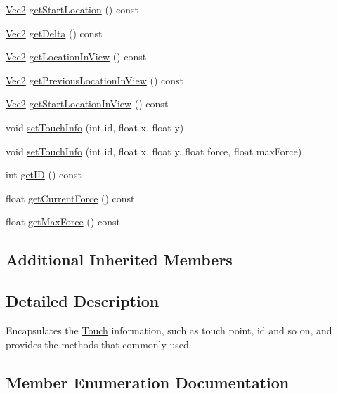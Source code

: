 \begin{DoxyCompactItemize}
\item 
\hyperlink{classVec2}{Vec2} \hyperlink{classTouch_a41f954b7af4bd5ae3af1f78ace3bc4e2}{get\+Start\+Location} () const
\item 
\hyperlink{classVec2}{Vec2} \hyperlink{classTouch_a386d29f52c790a8b5232a1e248390aa7}{get\+Delta} () const
\item 
\hyperlink{classVec2}{Vec2} \hyperlink{classTouch_adf4ed41586532a805e391b2f1de5e9a9}{get\+Location\+In\+View} () const
\item 
\hyperlink{classVec2}{Vec2} \hyperlink{classTouch_add6c4fcef98e104067cf833639ac410d}{get\+Previous\+Location\+In\+View} () const
\item 
\hyperlink{classVec2}{Vec2} \hyperlink{classTouch_a9e7c3b29da7fc935b3e894a48f1fc716}{get\+Start\+Location\+In\+View} () const
\item 
void \hyperlink{classTouch_a9168ec4828464fb2b93138d7ea59a605}{set\+Touch\+Info} (int id, float x, float y)
\item 
void \hyperlink{classTouch_a086ff2a5bfdfc1f07bdee7266fb48368}{set\+Touch\+Info} (int id, float x, float y, float force, float max\+Force)
\item 
int \hyperlink{classTouch_a68fe0fa8c82e12d4b718989a3064ebea}{get\+ID} () const
\item 
float \hyperlink{classTouch_a05f094436515098deac33467fcb361d4}{get\+Current\+Force} () const
\item 
float \hyperlink{classTouch_a4aa254ea9e7d9dba69439b295da0ccb0}{get\+Max\+Force} () const
\end{DoxyCompactItemize}
\subsection*{Additional Inherited Members}


\subsection{Detailed Description}
Encapsulates the \hyperlink{classTouch}{Touch} information, such as touch point, id and so on, and provides the methods that commonly used. 

\subsection{Member Enumeration Documentation}
\mbox{\label{classTouch_a3970fe1342ce78786781e8383164983d}} 
